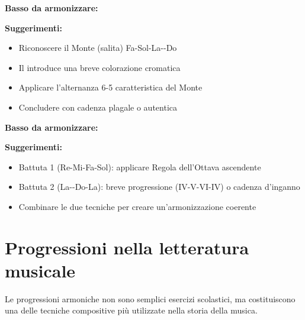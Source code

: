 \begin{esempio}
	\label{ex:esercizio_2}
	
	\textbf{Basso da armonizzare:}
	
	\textbf{Suggerimenti:}
	\begin{itemize}
		\item Riconoscere il Monte (salita) Fa-Sol-La-\Sibemolle -Do
		\item Il \Mibemolle  introduce una breve colorazione cromatica
		\item Applicare l'alternanza 6-5 caratteristica del Monte
		\item Concludere con cadenza plagale o autentica
	\end{itemize}
\end{esempio}

\begin{esempio}
	\label{ex:esercizio_3}
	
	\textbf{Basso da armonizzare:}
	
	\textbf{Suggerimenti:}
	\begin{itemize}
		\item Battuta 1 (Re-Mi-Fa-Sol): applicare Regola dell'Ottava ascendente
		\item Battuta 2 (La-\Sibemolle -Do-La): breve progressione (IV-V-VI-IV) o cadenza d'inganno
		\item Combinare le due tecniche per creare un'armonizzazione coerente
	\end{itemize}
\end{esempio}

\section{Progressioni nella letteratura musicale}
\label{sec:progressioni_letteratura}

Le progressioni armoniche non sono semplici esercizi scolastici, ma costituiscono una delle tecniche compositive più utilizzate nella storia della musica.

